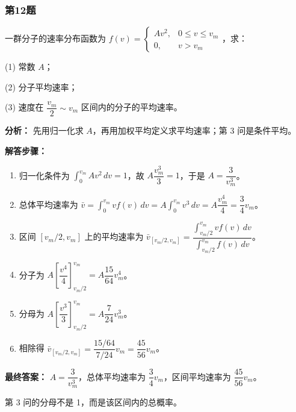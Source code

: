 \documentclass[12pt,a4paper]{ctexart}
\begin{document}
\subsubsection*{第12题}
\begin{tcolorbox}[colback=gray!2!white,colframe=black!60,title={题目}]
一群分子的速率分布函数为 \(f(v)=\begin{cases}Av^2, & 0\leq v\leq v_m \\ 0, & v>v_m\end{cases}\)，求：\par
(1) 常数 \(A\)；\par
(2) 分子平均速率；\par
(3) 速度在 \(\dfrac{v_m}{2}\sim v_m\) 区间内的分子的平均速率。\par
\end{tcolorbox}
\begin{tcolorbox}[colback=blue!2!white,colframe=blue!55!black,title={完整答案}]
\textbf{分析：}
先用归一化求 \(A\)，再用加权平均定义求平均速率；第 3 问是条件平均。\par
\textbf{解答步骤：}
\begin{enumerate}
\item 归一化条件为 \(\int_0^{v_m}Av^2\,dv=1\)，故 \(A\dfrac{v_m^3}{3}=1\)，于是 \(A=\dfrac{3}{v_m^3}\)。
\item 总体平均速率为 \(\bar v=\int_0^{v_m}vf(v)\,dv=A\int_0^{v_m}v^3\,dv=A\dfrac{v_m^4}{4}=\dfrac34 v_m\)。
\item 区间 \([v_m/2,v_m]\) 上的平均速率为 \(\bar v_{[v_m/2,v_m]}=\dfrac{\int_{v_m/2}^{v_m}vf(v)\,dv}{\int_{v_m/2}^{v_m}f(v)\,dv}\)。
\item 分子为 \(A\left[\dfrac{v^4}{4}\right]_{v_m/2}^{v_m}=A\dfrac{15}{64}v_m^4\)。
\item 分母为 \(A\left[\dfrac{v^3}{3}\right]_{v_m/2}^{v_m}=A\dfrac{7}{24}v_m^3\)。
\item 相除得 \(\bar v_{[v_m/2,v_m]}=\dfrac{15/64}{7/24}v_m=\dfrac{45}{56}v_m\)。
\end{enumerate}
\textbf{最终答案：}
\(A=\dfrac{3}{v_m^3}\)，总体平均速率为 \(\dfrac34 v_m\)，区间平均速率为 \(\dfrac{45}{56}v_m\)。\par
\end{tcolorbox}
\begin{tcolorbox}[colback=red!2!white,colframe=red!55!black,title={易错点}]
第 3 问的分母不是 1，而是该区间内的总概率。\par
\end{tcolorbox}
\end{document}
